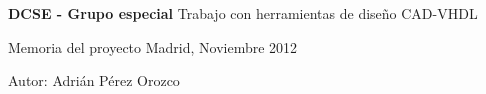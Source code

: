\begin{titlepage}
\sffamily
\begin{flushright}

\rightskip=-0cm


\vspace*{3cm}


\huge{\textbf{DCSE - Grupo especial}}
\linebreak
\LARGE{Trabajo con herramientas de diseño CAD-VHDL}

\vspace*{8cm}




\large{Memoria del proyecto}
\linebreak
\normalsize{Madrid, Noviembre 2012}

\vspace*{3cm}


\normalsize{Autor:}
\linebreak
\large{Adrián Pérez Orozco}
\linebreak

\end{flushright}
\end{titlepage}

